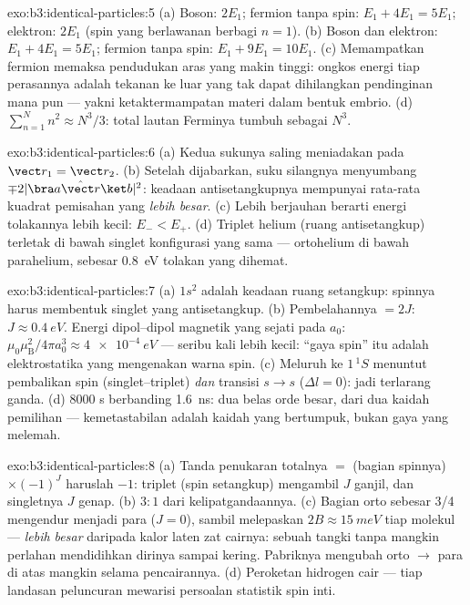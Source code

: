 \begin{solution}{exo:b3:identical-particles:5}
(a) Boson: $2E_1$; fermion tanpa spin: $E_1 + 4E_1 = 5E_1$;
elektron: $2E_1$ (spin yang berlawanan berbagi $n = 1$). (b) Boson dan
elektron: $E_1 + 4E_1 = 5E_1$; fermion tanpa spin: $E_1 + 9E_1 =
10E_1$. (c) Memampatkan fermion memaksa pendudukan aras yang makin
tinggi: ongkos energi tiap perasannya adalah tekanan ke luar yang tak
dapat dihilangkan pendinginan mana pun --- yakni ketaktermampatan materi
dalam bentuk embrio. (d)
$\sum_{n=1}^N n^2 \approx N^3/3$: total lautan Ferminya tumbuh sebagai
$N^3$.
\end{solution}

\begin{solution}{exo:b3:identical-particles:6}
(a) Kedua sukunya saling meniadakan pada $\vect r_1 = \vect r_2$. (b)
Setelah dijabarkan, suku silangnya menyumbang $\mp2|\bra a\hat{\vect r}\ket b|^2$:
keadaan antisetangkupnya mempunyai rata-rata kuadrat pemisahan yang
\emph{lebih besar}. (c) Lebih berjauhan berarti energi tolakannya lebih
kecil: $E_- <
E_+$. (d) Triplet helium (ruang antisetangkup) terletak
di bawah singlet konfigurasi yang sama --- ortohelium di bawah
parahelium, sebesar \qty{0.8}{eV} tolakan yang dihemat.
\end{solution}

\begin{solution}{exo:b3:identical-particles:7}
(a) $1s^2$ adalah keadaan ruang setangkup: spinnya harus membentuk
singlet yang antisetangkup. (b) Pembelahannya $= 2J$: $J \approx
\qty{0.4}{eV}$. Energi dipol--dipol magnetik yang sejati pada
$a_0$: $\mu_0\mu_{\text{B}}^2/4\pi a_0^3 \approx \qty{4e-4}{eV}$
--- seribu kali lebih kecil: ``gaya spin'' itu adalah elektrostatika
yang mengenakan warna spin. (c) Meluruh ke $1\,^1S$ menuntut pembalikan
spin (singlet--triplet) \emph{dan} transisi $s \to s$ ($\Delta l =
0$): jadi terlarang ganda. (d) $8000$ s berbanding \qty{1.6}{ns}: dua
belas orde besar, dari dua kaidah pemilihan --- kemetastabilan adalah
kaidah yang bertumpuk, bukan gaya yang melemah.
\end{solution}

\begin{solution}{exo:b3:identical-particles:8}
(a) Tanda penukaran totalnya $=$ (bagian spinnya) $\times (-1)^J$
haruslah $-1$: triplet (spin setangkup) mengambil $J$ ganjil, dan
singletnya $J$ genap.
(b) $3:1$ dari kelipatgandaannya. (c) Bagian orto sebesar 3/4 mengendur
menjadi para ($J = 0$), sambil melepaskan $2B \approx \qty{15}{meV}$
tiap molekul --- \emph{lebih besar} daripada kalor laten zat cairnya:
sebuah tangki tanpa mangkin perlahan mendidihkan dirinya sampai kering.
Pabriknya mengubah orto $\to$ para di atas mangkin selama pencairannya.
(d) Peroketan hidrogen cair --- tiap landasan peluncuran mewarisi
persoalan statistik spin inti.
\end{solution}

